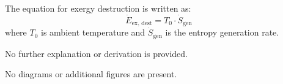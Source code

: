 The equation for exergy destruction is written as:  
\[
\dot{E}_{\text{ex, dest}} = T_0 \cdot \dot{S}_{\text{gen}}
\]  
where \( T_0 \) is ambient temperature and \( \dot{S}_{\text{gen}} \) is the entropy generation rate.  

No further explanation or derivation is provided.  

No diagrams or additional figures are present.